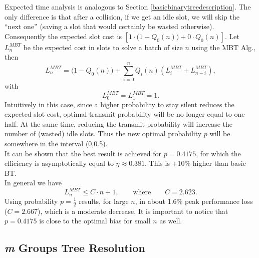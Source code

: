 \documentclass[12pt,a4paper]{report}
\newcommand{\rev}[1]{\textcolor{Cerulean}{#1}}
\begin{document}
Expected time analysis is analogous  to Section \ref{basicbinarytreedescription}. The only difference is that after a collision, if we get an idle slot, we will skip the ``next one'' (saving a slot that would certainly be wasted otherwise). Consequently the expected slot cost is $\left[1 \cdot \bigl(1-Q_{0}(n)\bigr)+ 0\cdot Q_{0}(n)\right]$. Let $L_{n}^{MBT}$ be the expected cost in slots to solve a batch of size $n$ using the MBT Alg., then\\
\begin{equation}
L_{n}^{MBT} = \bigl(1 - Q_{0}(n)\bigr)+\sum_{i=0}^{n} Q_{i}(n) (L_{i}^{MBT}+L_{n-i}^{MBT}),
\end{equation}
with
\begin{equation*}
L_{0}^{MBT} = L_{1}^{MBT}  = 1.
\end{equation*}
\rev{Intuitively in this case, since a higher probability to stay silent reduces the expected slot cost, optimal transmit probability will be no longer equal to one half.} At the same time, reducing the transmit probability will increase the number of (wasted) idle slots. Thus the new optimal probability $p$ will be somewhere in the interval (0,0.5).\\
It can be shown \cite{massey} that the best result is achieved for $p=0.4175$, for which the efficiency is asymptotically equal to $\eta \approx 0.381$. This is  +10\% higher than basic BT.\\
In general we have 
\begin{equation}
L_{n}^{MBT}\leq C \cdot n +1, \qquad \textrm{where} \qquad C=2.623.
\end{equation}
Using probability $p={\displaystyle\frac{1}{2}}$  results, for large $n$, in about 1.6\% peak performance loss  ($C=2.667$), which is a moderate decrease. \rev{ It is important to notice that  $p=0.4175$ is close to the optimal bias for small $n$ as well.\\}


\subsection{\emph{m} Groups Tree Resolution}
\label{se:mgroups}
\end{document}
